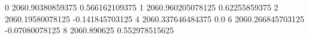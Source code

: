 0 2060.90380859375 0.566162109375
1 2060.960205078125 0.62255859375
2 2060.19580078125 -0.141845703125
4 2060.337646484375 0.0
6 2060.266845703125 -0.07080078125
8 2060.890625 0.552978515625
